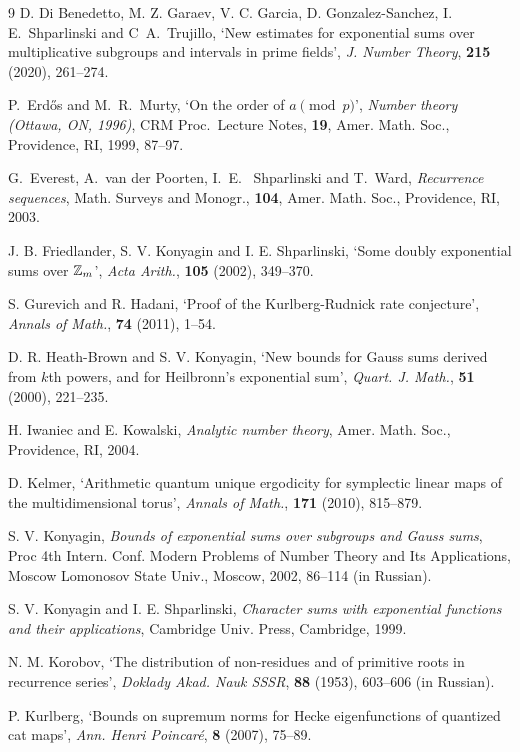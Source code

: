 \documentclass[12pt]{amsart}
\begin{document}
\begin{thebibliography}{9}
D.  Di Benedetto, M. Z. Garaev, V. C. Garcia, D.  Gonzalez-Sanchez, I.~ E.~Shparlinski and 
C~A.~Trujillo, `New estimates for exponential sums over multiplicative subgroups and intervals in prime fields',
{\it J. Number Theory\/}, {\bf  215} (2020), 261--274.

 P.~Erd\H os and M.~R.~Murty,
`On the order of $a\pmod p$',
{\it Number theory (Ottawa, ON, 1996)\/}, 
CRM Proc.\ Lecture Notes, {\bf 19}, Amer.  Math. Soc., Providence, RI, 1999, 
87--97. 
 

 G.~Everest, A.~van der Poorten, I.~E.~
Shparlinski and T.~Ward, {\it Recurrence sequences\/}, Math.
Surveys and Monogr., {\bf 104}, Amer. Math. Soc.,
Providence, RI, 2003.

J. B. Friedlander,  S. V. Konyagin and
 I. E. Shparlinski,  `Some doubly exponential sums over
${\mathbb Z}_m$',   {\it Acta Arith.\/},  {\bf 105} (2002),  349--370. 


  S.  Gurevich and R. Hadani, 
`Proof of the Kurlberg-Rudnick rate conjecture', 
{\it Annals of Math.\/},  {\bf 74} (2011), 1--54. 


D. R. Heath-Brown and S. V. Konyagin, `New bounds for Gauss sums
derived from $k$th powers,
and for Heilbronn's exponential sum',
{\it Quart. J. Math.\/}, {\bf 51} (2000), 221--235.

 
 H. Iwaniec and E. Kowalski,
\textit{Analytic number theory}, Amer.  Math.  Soc.,
Providence, RI, 2004. 

 D. Kelmer, `Arithmetic quantum unique ergodicity for symplectic linear maps of the multidimensional torus',  {\it Annals of Math.\/}, {\bf 171} (2010),  815--879. 

 S. V. Konyagin, \textit{Bounds of exponential sums over subgroups and
Gauss sums},  Proc 4th Intern. Conf. Modern Problems of Number
Theory and Its Applications, Moscow Lomonosov State Univ., Moscow,
2002, 86--114 (in Russian).

 S. V. Konyagin and  I. E. Shparlinski,
{\it Character sums with  exponential functions and
their applications\/}, Cambridge Univ. Press, Cambridge, 1999.

 N. M. Korobov,
`The distribution of non-residues and of
primitive roots in  recurrence series',
{\it Doklady Akad. Nauk SSSR\/},  {\bf 88} (1953),
603--606 (in Russian).

  P. Kurlberg, `Bounds on supremum norms for Hecke eigenfunctions of quantized cat maps',  {\it Ann. Henri Poincar{\'e}\/}, {\bf  8} (2007), 75--89. 



\end{thebibliography}
\end{document}
